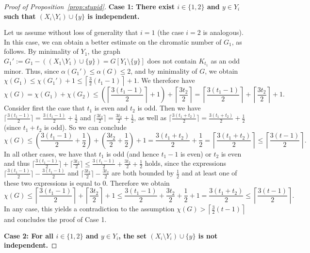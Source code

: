 \documentclass[11pt,reqno,oneside]{amsart}
\theoremstyle{definition}
\newcommand\1{\mathbf{1}}
\let\leq\leqslant
\begin{document}
\begin{proof}[Proof of Proposition~\ref{prop:stupid}]
\noindent \textbf{Case 1: There exist $i\in \{1,2\}$ and $y\in Y_i$ such that $(X_i\setminus Y_i)\cup \{y\}$ is independent.}

Let us assume without loss of generality that $i=1$ (the case $i=2$ is analogous). In this case, we can obtain a better estimate on the chromatic number of $G_1$, as follows. By minimality of $Y_1$, the graph $G_1':=G_1-((X_1\setminus Y_1)\cup \{y\})=G[Y_1\setminus \{y\}]$ does not contain $K_{t_1}$ as an odd minor. Thus, since $\alpha(G_1')\leq \alpha(G)\leq 2$, and by minimality of $G$, we obtain $\chi(G_1)\leq \chi(G_1')+1\leq  \left\lceil\frac{3}{2}(t_1-1)\right\rceil +1$. We therefore have
\[\chi(G)=\chi(G_1)+\chi(G_{2})\leq \left(\left\lceil\frac{3(t_1-1)}{2}\right\rceil +1\right)+\left\lceil\frac{3t_{2}}{2}\right\rceil=\left\lceil\frac{3(t_1-1)}{2}\right\rceil +\left\lceil\frac{3t_{2}}{2}\right\rceil+1.\]
Consider first the case that $t_1$ is even and $t_2$ is odd. Then we have $\big\lceil\frac{3(t_1-1)}{2}\big\rceil=\frac{3(t_1-1)}{2}+\frac12$ and $\big\lceil\frac{3t_2}{2}\big\rceil=\frac{3t_2}{2}+\frac12$, as well as $\big\lceil\frac{3(t_1+t_2)}{2}\big\rceil=\frac{3(t_1+t_2)}{2}+\frac12$ (since $t_1+t_2$ is odd). So we can conclude
\[\chi(G)\leq \left(\frac{3(t_1-1)}{2} +\frac12\right)+\left(\frac{3t_2}{2}+\frac12\right)+1=\frac{3(t_1+t_2)}{2} +\frac12=\left\lceil\frac{3(t_1+t_2)}{2}\right\rceil\leq \left\lceil\frac{3(t-1)}{2}\right\rceil.\]
In all other cases, we have that $t_1$ is odd (and hence $t_1-1$ is even) or $t_2$ is even and thus $\big\lceil\frac{3(t_1-1)}{2}\big\rceil+\big\lceil\frac{3t_2}{2}\big\rceil\leq \frac{3(t_1-1)}{2}+\frac{3t_2}{2}+\frac12$ holds, since the expressions $\big\lceil\frac{3(t_1-1)}{2}\big\rceil-\frac{3(t_1-1)}{2}$ and $\big\lceil\frac{3t_2}{2}\big\rceil-\frac{3t_2}{2}$ are both bounded by $\frac12$ and at least one of these two expressions is equal to $0$. Therefore we obtain
\[\chi(G)\leq \left\lceil\frac{3(t_1-1)}{2}\right\rceil +\left\lceil\frac{3t_{2}}{2}\right\rceil+1\leq \frac{3(t_1-1)}{2}+\frac{3t_2}{2}+\frac12+1=\frac{3(t_1+t_2)}{2} \leq\left\lceil\frac{3(t-1)}{2}\right\rceil.\]
In any case, this yields a contradiction to the assumption $\chi(G)>\left\lceil\frac{3}{2}(t-1)\right\rceil$ and concludes the proof of Case 1.

\noindent\textbf{{Case 2: For all $i\in \{1,2\}$ and $y\in Y_i$, the set $(X_i\setminus Y_i)\cup \{y\}$ is not independent.}}


\end{proof}
\end{document}
